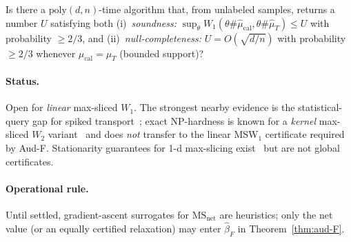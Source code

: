 \begin{conjecture}\label{conj:aud-computational}
Is there a $\mathrm{poly}(d,n)$-time algorithm that, from unlabeled samples, returns a number
$U$ satisfying both
\textup{(i)}~\emph{soundness:}
$\sup_{\theta}W_1(\theta\#\widehat\mu_{\mathrm{cal}},\theta\#\widehat\mu_T)\le U$ with
probability $\ge2/3$, and
\textup{(ii)}~\emph{null-completeness:} $U=O(\sqrt{d/n})$ with probability $\ge2/3$ whenever
$\mu_{\mathrm{cal}}=\mu_T$ (bounded support)?
\paragraph{Status.} Open for \emph{linear} max-sliced $W_1$. The strongest nearby evidence is
the statistical-query gap for spiked transport~\cite{niles2019estimation}; exact NP-hardness is
known for a \emph{kernel} max-sliced $W_2$ variant~\cite{wang2024kernelmsw} and does
\emph{not} transfer to the linear MSW$_1$ certificate required by Aud-F. Stationarity
guarantees for 1-d max-slicing exist~\cite{nietert2022sliced} but are not global certificates.
\paragraph{Operational rule.} Until settled, gradient-ascent surrogates for
$\mathrm{MS}_{\mathrm{net}}$ are heuristics; only the net value (or an equally certified
relaxation) may enter $\widehat\beta_F$ in Theorem~\ref{thm:aud-F}.
\end{conjecture}
